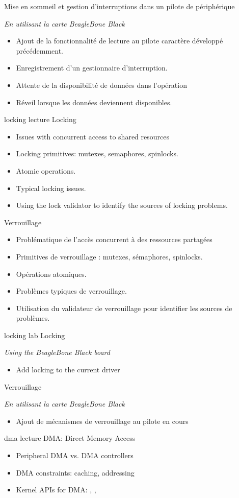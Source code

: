 {Mise en sommeil et gestion d'interruptions dans un pilote de périphérique}
{
  {\em En utilisant la carte BeagleBone Black}
  \begin{itemize}
  \item Ajout de la fonctionnalité de lecture au pilote caractère développé
    précédemment.
  \item Enregistrement d'un gestionnaire d'interruption.
  \item Attente de la disponibilité de données dans l'opération 
  \item Réveil lorsque les données deviennent disponibles.
  \end{itemize}
}
{locking}
{lecture}
{Locking}
{
  \begin{itemize}
  \item Issues with concurrent access to shared resources
  \item Locking primitives: mutexes, semaphores, spinlocks.
  \item Atomic operations.
  \item Typical locking issues.
  \item Using the lock validator to identify the sources of locking
    problems.
  \end{itemize}
}
{Verrouillage}
{
  \begin{itemize}
  \item Problématique de l'accès concurrent à des ressources partagées
  \item Primitives de verrouillage : mutexes, sémaphores, spinlocks.
  \item Opérations atomiques.
  \item Problèmes typiques de verrouillage.
  \item Utilisation du validateur de verrouillage pour identifier les
    sources de problèmes.
  \end{itemize}
}
{locking}
{lab}
{Locking}
{
  {\em Using the BeagleBone Black board}
  \begin{itemize}
  \item Add locking to the current driver
  \end{itemize}
}
{Verrouillage}
{
  {\em En utilisant la carte BeagleBone Black}
  \begin{itemize}
  \item Ajout de mécanismes de verrouillage au pilote en cours
  \end{itemize}
}
{dma}
{lecture}
{DMA: Direct Memory Access}
{
  \begin{itemize}
  \item Peripheral DMA vs. DMA controllers
  \item DMA constraints: caching, addressing
  \item Kernel APIs for DMA: , , 
  \end{itemize}
}
